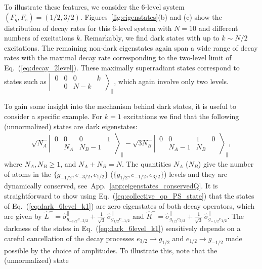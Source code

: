 \documentclass[aps,prx,superscriptaddress,twocolumn,notitlepage,nofootinbib,longbibliography]{revtex4-2}
\begin{document}
To illustrate these features, we consider the 6-level system $(F_g,F_e)=(1/2,3/2)$. Figures~\ref{fig:eigenstates}(b) and (c) show the distribution of decay rates for this 6-level system with $N=10$ and different numbers of excitations $k$. Remarkably, we find dark states with up to $k\sim N/2$ excitations. The remaining non-dark eigenstates again span a wide range of decay rates with the maximal decay rate corresponding to the two-level limit of Eq.~(\ref{eq:decay_2level}). These maximally superradiant states correspond to states such as $\left|\, \begin{smallmatrix} 0 & 0 & 0 & k \\ & 0 & N-k & \end{smallmatrix} \,\right\rangle_\parallel $, which again involve only two levels.

To gain some insight into the mechanism behind dark states, it is useful to consider a specific example. For $k=1$ excitations we find that the following (unnormalized) states are dark eigenstates:
\begin{align}
	\sqrt{N_A} \left|\, \begin{smallmatrix} 0 & 0 & 0 & 1 \\  & N_A & N_B-1 &  \end{smallmatrix} \,\right\rangle_\parallel - \sqrt{3N_B} \left|\, \begin{smallmatrix} 0 & 0 & 1 & 0 \\  & N_A-1 & N_B &  \end{smallmatrix} \,\right\rangle_\parallel ,
\label{eq:dark_6level_k1}
\end{align}
where $N_A,N_B\geq1$, and $N_A+N_B=N$.
The quantities $N_{A}$ ($N_B$) give the number of atoms in the $\{g_{-1/2}, e_{-3/2}, e_{1/2}\}$ ($\{g_{1/2}, e_{-1/2}, e_{3/2}\}$) levels and they are dynamically conserved, see~App.~\ref{app:eigenstates_conservedQ}.
It is straightforward to show using Eq.~(\ref{eq:collective_op_PS_state}) that the states of Eq.~(\ref{eq:dark_6level_k1}) are zero eigenstates of both decay operators, which are given by $\hat{L}^-=\hat{\sigma}^\parallel_{g_{-1/2}e_{-3/2}} + \frac{1}{\sqrt{3}}\,\hat{\sigma}^\parallel_{g_{1/2}e_{-1/2}}$ and $\hat{R}^-=\hat{\sigma}^\parallel_{g_{1/2}e_{3/2}} + \frac{1}{\sqrt{3}}\,\hat{\sigma}^\parallel_{g_{-1/2}e_{1/2}}$. The darkness of the states in Eq.~(\ref{eq:dark_6level_k1}) sensitively depends on a careful cancellation of the decay processes $e_{3/2}\rightarrow g_{1/2}$ and $e_{1/2}\rightarrow g_{-1/2}$ made possible by the choice of amplitudes. To illustrate this, note that the (unnormalized) state
\end{document}
